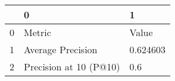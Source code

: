 \begin{tabular}{lll}
\toprule
{} &                       0 &         1 \\
\midrule
0 &                  Metric &     Value \\
1 &       Average Precision &  0.624603 \\
2 &  Precision at 10 (P@10) &       0.6 \\
\bottomrule
\end{tabular}
